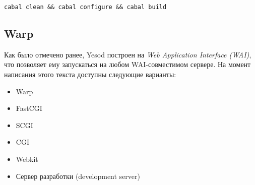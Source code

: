 \begin{lstlisting}
cabal clean && cabal configure && cabal build
\end{lstlisting}

%
\subsection{Warp}
%
%
%

Как было отмечено ранее, Yesod построен на \emph{Web Application Interface (WAI)}, что позволяет ему запускаться на любом WAI-совместимом сервере. На момент написания этого текста доступны следующие варианты:
\begin{itemize}
    \item Warp
    \item FastCGI
    \item SCGI
    \item CGI
    \item Webkit
    \item Сервер разработки (development server)
\end{itemize}


